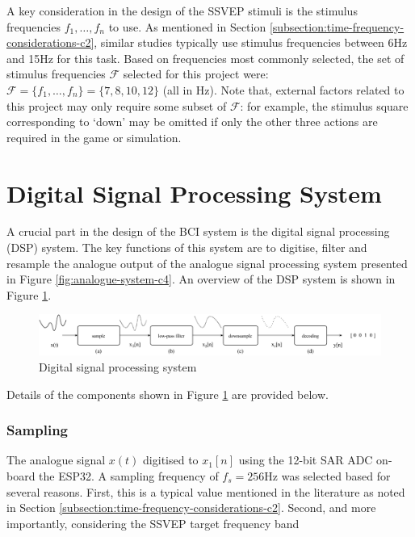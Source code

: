 A key consideration in the design of the SSVEP stimuli is the stimulus frequencies $f_1, \dots, f_n$ to use. As mentioned in Section \ref{subsection:time-frequency-considerations-c2}, similar studies typically use stimulus frequencies between 6Hz and 15Hz for this task. Based on frequencies most commonly selected, the set of stimulus frequencies $\mathcal{F}$ selected for this project were: $\mathcal{F} = \{f_1, \dots, f_n\} = \{7, 8, 10, 12\}$ (all in Hz). Note that, external factors related to this project may only require some subset of $\mathcal{F}$: for example, the stimulus square corresponding to `down' may be omitted if only the other three actions are required in the game or simulation. 

\section{Digital Signal Processing System}

A crucial part in the design of the BCI system is the digital signal processing (DSP) system. The key functions of this system are to digitise, filter and resample the analogue output of the analogue signal processing system presented in Figure \ref{fig:analogue-system-c4}. An overview of the DSP system is shown in Figure \ref{fig:digital-system-c5}.

\begin{figure}
    \centering
    \includegraphics[width=\textwidth]{digital-system}
    \caption{Digital signal processing system}
    \label{fig:digital-system-c5}
\end{figure}

Details of the components shown in Figure \ref{fig:digital-system-c5} are provided below. 

\subsubsection{Sampling}
The analogue signal $x(t)$ digitised to $x_1[n]$ using the 12-bit SAR ADC on-board the ESP32. A sampling frequency of $f_s=256$Hz was selected based for several reasons. First, this is a typical value mentioned in the literature as noted in Section \ref{subsection:time-frequency-considerations-c2}. Second, and more importantly, considering the SSVEP target frequency band 

